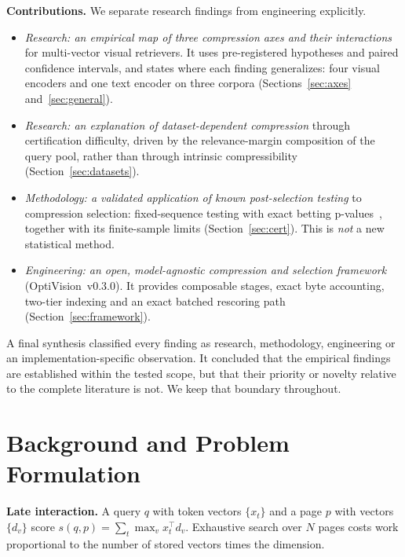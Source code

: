 \documentclass[conference]{IEEEtran}
\begin{document}
\textbf{Contributions.} We separate research findings from engineering explicitly.
\begin{itemize}
\item \emph{Research: an empirical map of three compression axes and their interactions}
for multi-vector visual retrievers. It uses pre-registered hypotheses and paired
confidence intervals, and states where each finding generalizes: four visual encoders
and one text encoder on three corpora (Sections~\ref{sec:axes} and~\ref{sec:general}).
\item \emph{Research: an explanation of dataset-dependent compression} through
certification difficulty, driven by the relevance-margin composition of the query pool,
rather than through intrinsic compressibility (Section~\ref{sec:datasets}).
\item \emph{Methodology: a validated application of known post-selection testing} to
compression selection: fixed-sequence testing with exact betting
p-values~\cite{waudbysmith2024betting,angelopoulos2021ltt}, together with its
finite-sample limits (Section~\ref{sec:cert}). This is \emph{not} a new statistical
method.
\item \emph{Engineering: an open, model-agnostic compression and selection framework}
(OptiVision~v0.3.0). It provides composable stages, exact byte accounting, two-tier
indexing and an exact batched rescoring path (Section~\ref{sec:framework}).
\end{itemize}
A final synthesis classified every finding as research, methodology, engineering or an
implementation-specific observation. It concluded that the empirical findings are
established within the tested scope, but that their priority or novelty relative to the
complete literature is not. We keep that boundary throughout.

\section{Background and Problem Formulation}
\label{sec:background}

\textbf{Late interaction.} A query $q$ with token vectors $\{x_t\}$ and a page $p$ with
vectors $\{d_v\}$ score $s(q,p)=\sum_t \max_v x_t^\top d_v$. Exhaustive search over $N$
pages costs work proportional to the number of stored vectors times the dimension.
\end{document}
